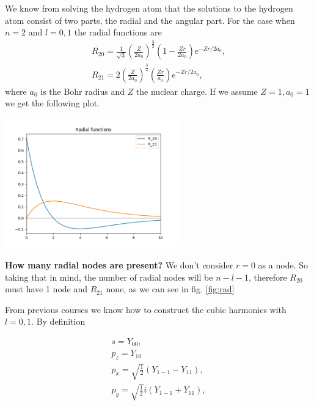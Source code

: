 \begin{questions}
\begin{solution}
  We know from solving the hydrogen atom that the solutions to the hydrogen atom consist of two parts, the radial and the angular part. For the case when $n=2$ and $l=0,1$ the radial functions are
  \begin{eqnarray}
        R_{20} = \frac{1}{\sqrt{3}}\left(\frac{Z}{2a_0}\right)^{\frac{3}{2}}\left(1- \frac{Zr}{2a_0}\right)e^{-Zr/2a_0},\\
        R_{21} = 2 \left(\frac{Z}{2a_0}\right)^{\frac{3}{2}}\left(\frac{Zr}{a_0}\right)e^{-Zr/2a_0},\qquad
  \end{eqnarray}
  where $a_0$ is the Bohr radius and $Z$ the nuclear charge. If we assume $Z = 1, a_0 =1$ we get the following plot.
\begin{center}
  \includegraphics[width=75mm]{radials.png}\label{fig:rad}
\end{center}
\textbf{How many radial nodes are present?} We don't consider $r=0$ as a node. So taking that in mind, the number of radial nodes will be $n-l-1$, therefore $R_{20}$ must have 1 node and $R_{21}$ none, as we can see in fig. \ref{fig:rad}
\end{solution}

\begin{solution}

  From previous courses we know how to construct the cubic harmonics with $l=0,1$. By definition

  \begin{eqnarray}
      s = Y_{00}, \qquad \qquad \qquad\label{defs1}\\
      p_z = Y_{10} \qquad \qquad \qquad\label{defs2}\\
      p_x= \sqrt{\frac{1}{2}}(Y_{1-1} - Y_{11}),\label{defs3}\\
      p_y = \sqrt{\frac{1}{2}}i(Y_{1-1} + Y_{11}),
      \label{defs4}
  \end{eqnarray}


\end{solution}
\end{questions}

